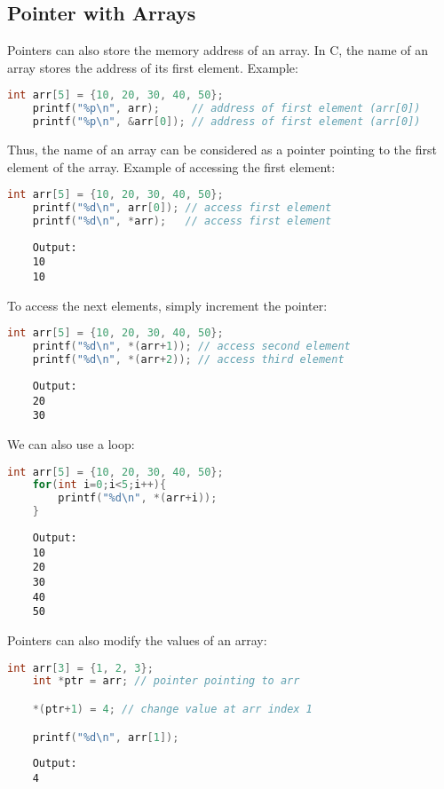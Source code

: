 \subsection{Pointer with Arrays}

Pointers can also store the memory address of an array.
In C, the name of an array stores the address of its first element.
Example:
\begin{lstlisting}[language=c]
	int arr[5] = {10, 20, 30, 40, 50};
	printf("%p\n", arr);     // address of first element (arr[0])
	printf("%p\n", &arr[0]); // address of first element (arr[0])
\end{lstlisting}
Thus, the name of an array can be considered as a pointer pointing to the first element of the array.
Example of accessing the first element:
\begin{lstlisting}[language=c]
	int arr[5] = {10, 20, 30, 40, 50};
	printf("%d\n", arr[0]); // access first element
	printf("%d\n", *arr);   // access first element    
\end{lstlisting}
\begin{verbatim}
    Output:
    10
    10
\end{verbatim}
To access the next elements, simply increment the pointer:
\begin{lstlisting}[language=c]
	int arr[5] = {10, 20, 30, 40, 50};
	printf("%d\n", *(arr+1)); // access second element
	printf("%d\n", *(arr+2)); // access third element    
\end{lstlisting}
\begin{verbatim}
    Output:
    20
    30
\end{verbatim}
We can also use a loop:
\begin{lstlisting}[language=c]
	int arr[5] = {10, 20, 30, 40, 50};
	for(int i=0;i<5;i++){
		printf("%d\n", *(arr+i));
	}
\end{lstlisting}    
\begin{verbatim}
	Output:
	10
	20
	30
	40
	50
\end{verbatim}
Pointers can also modify the values of an array:
\begin{lstlisting}[language=c]
	int arr[3] = {1, 2, 3};
	int *ptr = arr; // pointer pointing to arr

	*(ptr+1) = 4; // change value at arr index 1

	printf("%d\n", arr[1]);
\end{lstlisting}
\begin{verbatim}
	Output:
	4
\end{verbatim}

